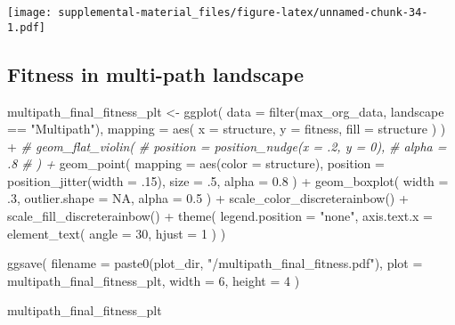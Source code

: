 \documentclass[
]{book}
\newenvironment{Shaded}{\begin{snugshade}}{\end{snugshade}}
\newcommand{\AttributeTok}[1]{\textcolor[rgb]{0.77,0.63,0.00}{#1}}
\newcommand{\CommentTok}[1]{\textcolor[rgb]{0.56,0.35,0.01}{\textit{#1}}}
\newcommand{\ConstantTok}[1]{\textcolor[rgb]{0.00,0.00,0.00}{#1}}
\newcommand{\DecValTok}[1]{\textcolor[rgb]{0.00,0.00,0.81}{#1}}
\newcommand{\FloatTok}[1]{\textcolor[rgb]{0.00,0.00,0.81}{#1}}
\newcommand{\FunctionTok}[1]{\textcolor[rgb]{0.00,0.00,0.00}{#1}}
\newcommand{\NormalTok}[1]{#1}
\newcommand{\OtherTok}[1]{\textcolor[rgb]{0.56,0.35,0.01}{#1}}
\newcommand{\SpecialCharTok}[1]{\textcolor[rgb]{0.00,0.00,0.00}{#1}}
\newcommand{\StringTok}[1]{\textcolor[rgb]{0.31,0.60,0.02}{#1}}
\begin{document}
\texttt{[image: supplemental-material\_files/figure-latex/unnamed-chunk-34-1.pdf]}

\hypertarget{fitness-in-multi-path-landscape-1}{%
\subsection{Fitness in multi-path landscape}\label{fitness-in-multi-path-landscape-1}}

\begin{Shaded}
\begin{Highlighting}[]
\NormalTok{multipath\_final\_fitness\_plt }\OtherTok{\textless{}{-}} \FunctionTok{ggplot}\NormalTok{(}
    \AttributeTok{data =} \FunctionTok{filter}\NormalTok{(max\_org\_data, landscape }\SpecialCharTok{==} \StringTok{"Multipath"}\NormalTok{),}
    \AttributeTok{mapping =} \FunctionTok{aes}\NormalTok{(}
      \AttributeTok{x =}\NormalTok{ structure,}
      \AttributeTok{y =}\NormalTok{ fitness,}
      \AttributeTok{fill =}\NormalTok{ structure}
\NormalTok{    )}
\NormalTok{  ) }\SpecialCharTok{+}
  \CommentTok{\# geom\_flat\_violin(}
  \CommentTok{\#   position = position\_nudge(x = .2, y = 0),}
  \CommentTok{\#   alpha = .8}
  \CommentTok{\# ) +}
  \FunctionTok{geom\_point}\NormalTok{(}
    \AttributeTok{mapping =} \FunctionTok{aes}\NormalTok{(}\AttributeTok{color =}\NormalTok{ structure),}
    \AttributeTok{position =} \FunctionTok{position\_jitter}\NormalTok{(}\AttributeTok{width =}\NormalTok{ .}\DecValTok{15}\NormalTok{),}
    \AttributeTok{size =}\NormalTok{ .}\DecValTok{5}\NormalTok{,}
    \AttributeTok{alpha =} \FloatTok{0.8}
\NormalTok{  ) }\SpecialCharTok{+}
  \FunctionTok{geom\_boxplot}\NormalTok{(}
    \AttributeTok{width =}\NormalTok{ .}\DecValTok{3}\NormalTok{,}
    \AttributeTok{outlier.shape =} \ConstantTok{NA}\NormalTok{,}
    \AttributeTok{alpha =} \FloatTok{0.5}
\NormalTok{  ) }\SpecialCharTok{+}
  \FunctionTok{scale\_color\_discreterainbow}\NormalTok{() }\SpecialCharTok{+}
  \FunctionTok{scale\_fill\_discreterainbow}\NormalTok{() }\SpecialCharTok{+}
  \FunctionTok{theme}\NormalTok{(}
    \AttributeTok{legend.position =} \StringTok{"none"}\NormalTok{,}
    \AttributeTok{axis.text.x =} \FunctionTok{element\_text}\NormalTok{(}
      \AttributeTok{angle =} \DecValTok{30}\NormalTok{,}
      \AttributeTok{hjust =} \DecValTok{1}
\NormalTok{    )}
\NormalTok{  )}

\FunctionTok{ggsave}\NormalTok{(}
  \AttributeTok{filename =} \FunctionTok{paste0}\NormalTok{(plot\_dir, }\StringTok{"/multipath\_final\_fitness.pdf"}\NormalTok{),}
  \AttributeTok{plot =}\NormalTok{ multipath\_final\_fitness\_plt,}
  \AttributeTok{width =} \DecValTok{6}\NormalTok{,}
  \AttributeTok{height =} \DecValTok{4}
\NormalTok{)}

\NormalTok{multipath\_final\_fitness\_plt}
\end{Highlighting}
\end{Shaded}
\end{document}
